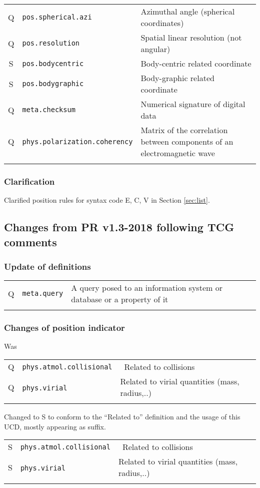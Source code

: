 \documentclass[11pt,a4paper]{ivoa}
\begin{document}
\begin{longtable}[h!]{c|p{39.5ex}|D{0.45\textwidth}}
Q & {\tt pos.spherical.azi} & Azimuthal angle (spherical coordinates)\\
Q & {\tt pos.resolution} & Spatial linear resolution (not angular)\\
S & {\tt pos.bodycentric} & Body-centric related coordinate\\
S & {\tt pos.bodygraphic} & Body-graphic related coordinate\\
Q & {\tt meta.checksum} & Numerical signature of digital data\\
Q & {\tt phys.polarization.coherency} & Matrix of the correlation between components of an electromagnetic wave\\
\sptablerule
\end{longtable}
\subsubsection*{Clarification}
Clarified position rules for syntax code E, C, V in Section \ref{sec:list}.  

\subsection{Changes from PR v1.3-2018 following TCG comments}
\subsubsection*{Update of definitions} 
\footnotesize\begin{longtable}[h!]{c|p{39.5ex}|D{0.45\textwidth}}
\sptablerule
Q & {\tt meta.query} &  A query posed to an information system or database or a property of it\\
\sptablerule
\end{longtable}

\subsubsection*{Changes of position indicator} 
Was
\footnotesize\begin{longtable}[h!]{c|p{39.5ex}|D{0.45\textwidth}}
\sptablerule
Q & {\tt phys.atmol.collisional} & Related to collisions\\
Q & {\tt phys.virial}            & Related to virial quantities (mass, radius,..)\\
\sptablerule
\end{longtable}
Changed to S to conform to the “Related to” definition and the usage of this UCD, mostly appearing as suffix.  
\footnotesize\begin{longtable}[h!]{c|p{39.5ex}|D{0.45\textwidth}}
\sptablerule
S & {\tt phys.atmol.collisional} & Related to collisions\\
S & {\tt phys.virial}            & Related to virial quantities (mass, radius,..)\\
\sptablerule
\end{longtable}
\end{document}
